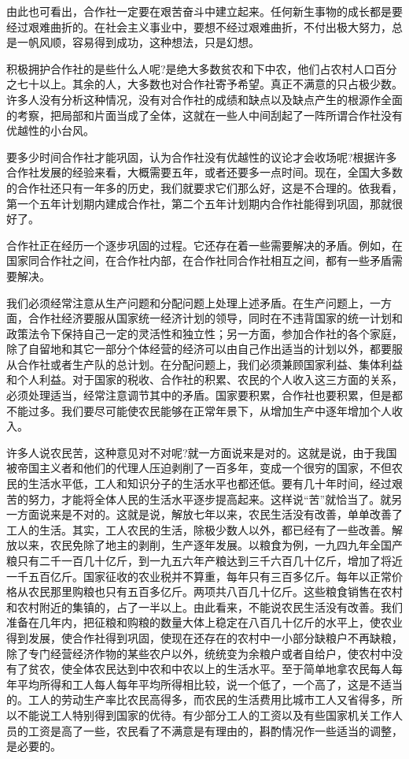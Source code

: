 \documentclass[UTF8, 12pt, a4paper]{ctexrep}
\begin{document}
由此也可看出，合作社一定要在艰苦奋斗中建立起来。任何新生事物的成长都是要经过艰难曲折的。在社会主义事业中，要想不经过艰难曲折，不付出极大努力，总是一帆风顺，容易得到成功，这种想法，只是幻想。

积极拥护合作社的是些什么人呢?是绝大多数贫农和下中农，他们占农村人口百分之七十以上。其余的人，大多数也对合作社寄予希望。真正不满意的只占极少数。许多人没有分析这种情况，没有对合作社的成绩和缺点以及缺点产生的根源作全面的考察，把局部和片面当成了全体，这就在一些人中间刮起了一阵所谓合作社没有优越性的小台风。

要多少时间合作社才能巩固，认为合作社没有优越性的议论才会收场呢?根据许多合作社发展的经验来看，大概需要五年，或者还要多一点时间。现在，全国大多数的合作社还只有一年多的历史，我们就要求它们那么好，这是不合理的。依我看，第一个五年计划期内建成合作社，第二个五年计划期内合作社能得到巩固，那就很好了。

合作社正在经历一个逐步巩固的过程。它还存在着一些需要解决的矛盾。例如，在国家同合作社之间，在合作社内部，在合作社同合作社相互之间，都有一些矛盾需要解决。

我们必须经常注意从生产问题和分配问题上处理上述矛盾。在生产问题上，一方面，合作社经济要服从国家统一经济计划的领导，同时在不违背国家的统一计划和政策法令下保持自己一定的灵活性和独立性；另一方面，参加合作社的各个家庭，除了自留地和其它一部分个体经营的经济可以由自己作出适当的计划以外，都要服从合作社或者生产队的总计划。在分配问题上，我们必须兼顾国家利益、集体利益和个人利益。对于国家的税收、合作社的积累、农民的个人收入这三方面的关系，必须处理适当，经常注意调节其中的矛盾。国家要积累，合作社也要积累，但是都不能过多。我们要尽可能使农民能够在正常年景下，从增加生产中逐年增加个人收入。

许多人说农民苦，这种意见对不对呢?就一方面说来是对的。这就是说，由于我国被帝国主义者和他们的代理人压迫剥削了一百多年，变成一个很穷的国家，不但农民的生活水平低，工人和知识分子的生活水平也都还低。要有几十年时间，经过艰苦的努力，才能将全体人民的生活水平逐步提高起来。这样说“苦”就恰当了。就另一方面说来是不对的。这就是说，解放七年以来，农民生活没有改善，单单改善了工人的生活。其实，工人农民的生活，除极少数人以外，都已经有了一些改善。解放以来，农民免除了地主的剥削，生产逐年发展。以粮食为例，一九四九年全国产粮只有二千一百几十亿斤，到一九五六年产粮达到三千六百几十亿斤，增加了将近一千五百亿斤。国家征收的农业税并不算重，每年只有三百多亿斤。每年以正常价格从农民那里购粮也只有五百多亿斤。两项共八百几十亿斤。这些粮食销售在农村和农村附近的集镇的，占了一半以上。由此看来，不能说农民生活没有改善。我们准备在几年内，把征粮和购粮的数量大体上稳定在八百几十亿斤的水平上，使农业得到发展，使合作社得到巩固，使现在还存在的农村中一小部分缺粮户不再缺粮，除了专门经营经济作物的某些农户以外，统统变为余粮户或者自给户，使农村中没有了贫农，使全体农民达到中农和中农以上的生活水平。至于简单地拿农民每人每年平均所得和工人每人每年平均所得相比较，说一个低了，一个高了，这是不适当的。工人的劳动生产率比农民高得多，而农民的生活费用比城市工人又省得多，所以不能说工人特别得到国家的优待。有少部分工人的工资以及有些国家机关工作人员的工资是高了一些，农民看了不满意是有理由的，斟酌情况作一些适当的调整，是必要的。
\end{document}
